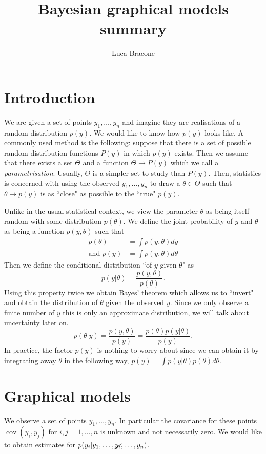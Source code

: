 \documentclass{scrartcl}
\author{Luca Bracone}
\title{Bayesian graphical models summary}
\DeclareMathOperator{\cov}{cov}
\begin{document}
\maketitle
\section{Introduction}
We are given a set of points $y_1, \dots, y_n$ and imagine they are
realisations of a random distribution $p(y)$.
We would like to know how $p(y)$ looks like.
A commonly used method is the following: suppose that there is a set of
possible random distribution functions $P(y)$ in which $p(y)$ exists.
Then we assume that there exists a set $\Theta$ and a function $\Theta \to P(y)$
which we call a \emph{parametrisation}.
Usually, $\Theta$ is a simpler set to study than $P(y)$.
Then, statistics is concerned with using the observed $y_1,\dots,y_n$ to draw a
$\theta \in \Theta$ such that $\theta \mapsto p(y)$ is as ``close" as possible
to the ``true" $p(y)$.

Unlike in the usual statistical context, we view the parameter $\theta$ as
being itself random with some distribution $p(\theta)$. We define the joint
probability of $y$ and $\theta$ as being a function $p(y,\theta)$ such that
\begin{align*}
	p(\theta)        & = \int p(y,\theta) dy      \\
	\text{and } p(y) & = \int p(y,\theta) d\theta
\end{align*}
Then we define the conditional distribution ``of $y$ given $\theta$" as
\[
	p(y|\theta) = \frac{p(y,\theta)}{p(\theta)}.
\]
Using this property twice we obtain Bayes' theorem which allows us to ``invert"
and obtain the distribution of $\theta$ given the observed $y$. Since we only
observe a finite number of $y$ this is only an approximate distribution, we
will talk about uncertainty later on.
\[
	p(\theta|y) = \frac{p(y,\theta)}{p(y)} = \frac{p(\theta)p(y|\theta)}{p(y)}.
\]
In practice, the factor $p(y)$ is nothing to worry about since we can obtain it by integrating away $\theta$ in the following way,
$p(y) = \int p(y|\theta)p(\theta)d\theta$.

\section{Graphical models}
We observe a set of points $y_1, \dots, y_n$.
In particular the covariance for these points $\cov(y_i, y_j)$ for $i,j = 1,\dots,
	n$ is unknown and not necessarily zero.
We would like to obtain estimates for $p(y_i | y_1,\dots, \cancel{y_i},\dots, y_n)$.
\end{document}
